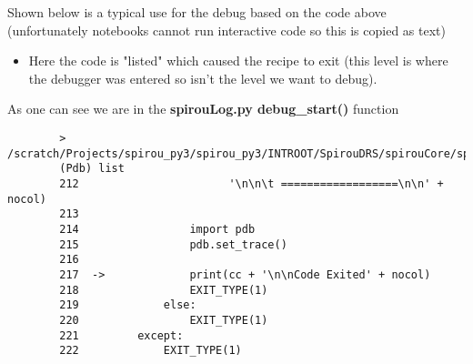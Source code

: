 \documentclass[11pt]{article}
\providecommand{\tightlist}{%
      \setlength{\itemsep}{0pt}\setlength{\parskip}{0pt}}
\begin{document}
Shown below is a typical use for the debug based on the code above
(unfortunately notebooks cannot run interactive code so this is copied
as text)

    \begin{itemize}
\tightlist
\item
  Here the code is "listed" which caused the recipe to exit (this level
  is where the debugger was entered so isn't the level we want to
  debug).
\end{itemize}

As one can see we are in the \textbf{spirouLog.py debug\_start()}
function

\begin{verbatim}
        > /scratch/Projects/spirou_py3/spirou_py3/INTROOT/SpirouDRS/spirouCore/spirouLog.py(217)debug_start()
        (Pdb) list
        212                       '\n\n\t ==================\n\n' + nocol)
        213
        214                 import pdb
        215                 pdb.set_trace()
        216
        217  ->             print(cc + '\n\nCode Exited' + nocol)
        218                 EXIT_TYPE(1)
        219             else:
        220                 EXIT_TYPE(1)
        221         except:
        222             EXIT_TYPE(1)
\end{verbatim}
\end{document}
